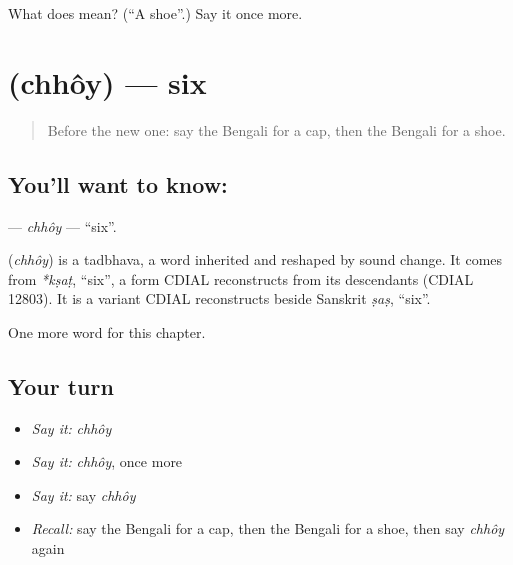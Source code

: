 \begin{tcolorbox}[breakable,colback=teal!4,colframe=teal!35!black,title={Before you move on}]
What does  mean? (\textquotedblleft{}A shoe\textquotedblright{}.) Say it once more.
\end{tcolorbox}
\section[\texorpdfstring{\bn{ছয়} (chhôy)}{ছয় (chhôy)}]{ (chhôy) — six}

\label{lesson:BN-C86-chhoy}



\begin{quote}
Before the new one: say the Bengali for a cap, then the Bengali for a shoe.
\end{quote}

\subsection*{You'll want to know: }
\textbf{} — \emph{chhôy} — \textquotedblleft{}six\textquotedblright{}.

\begin{cousinweb}
\textbf{} (\emph{chhôy}) is a tadbhava, a word inherited and reshaped by sound change. It comes from \emph{*kṣaṭ}, \textquotedblleft{}six\textquotedblright{}, a form CDIAL reconstructs from its descendants (CDIAL 12803). It is a variant CDIAL reconstructs beside Sanskrit \emph{ṣaṣ}, \textquotedblleft{}six\textquotedblright{}.
\end{cousinweb}

\begin{grammarlens}[title={What you've built}]
One more word for this chapter.
\end{grammarlens}

\subsection*{Your turn}
\begin{itemize}
\raggedright
  \item \emph{Say it:} \emph{chhôy}
  \item \emph{Say it:} \emph{chhôy}, once more
  \item \emph{Say it:} say \emph{chhôy}
  \item \emph{Recall:} say the Bengali for a cap, then the Bengali for a shoe, then say \emph{chhôy} again
\end{itemize}

